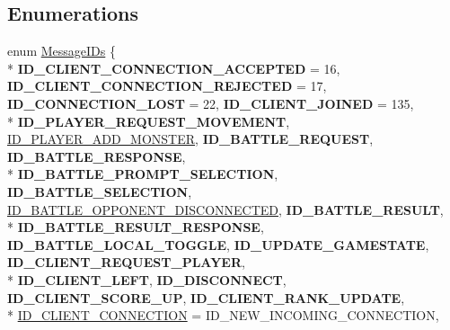 \subsection*{Enumerations}
\begin{DoxyCompactItemize}
\item 
enum \hyperlink{namespace_champ_net_plugin_a2ade5cfa7cf6c25ab7236c6b54a57821}{Message\-I\-Ds} \{ \\*
{\bfseries I\-D\-\_\-\-C\-L\-I\-E\-N\-T\-\_\-\-C\-O\-N\-N\-E\-C\-T\-I\-O\-N\-\_\-\-A\-C\-C\-E\-P\-T\-E\-D} = 16, 
{\bfseries I\-D\-\_\-\-C\-L\-I\-E\-N\-T\-\_\-\-C\-O\-N\-N\-E\-C\-T\-I\-O\-N\-\_\-\-R\-E\-J\-E\-C\-T\-E\-D} = 17, 
{\bfseries I\-D\-\_\-\-C\-O\-N\-N\-E\-C\-T\-I\-O\-N\-\_\-\-L\-O\-S\-T} = 22, 
{\bfseries I\-D\-\_\-\-C\-L\-I\-E\-N\-T\-\_\-\-J\-O\-I\-N\-E\-D} = 135, 
\\*
{\bfseries I\-D\-\_\-\-P\-L\-A\-Y\-E\-R\-\_\-\-R\-E\-Q\-U\-E\-S\-T\-\_\-\-M\-O\-V\-E\-M\-E\-N\-T}, 
\hyperlink{namespace_champ_net_plugin_a2ade5cfa7cf6c25ab7236c6b54a57821ad42c079bb7459dbaf419eeb2e845f3e2}{I\-D\-\_\-\-P\-L\-A\-Y\-E\-R\-\_\-\-A\-D\-D\-\_\-\-M\-O\-N\-S\-T\-E\-R}, 
{\bfseries I\-D\-\_\-\-B\-A\-T\-T\-L\-E\-\_\-\-R\-E\-Q\-U\-E\-S\-T}, 
{\bfseries I\-D\-\_\-\-B\-A\-T\-T\-L\-E\-\_\-\-R\-E\-S\-P\-O\-N\-S\-E}, 
\\*
{\bfseries I\-D\-\_\-\-B\-A\-T\-T\-L\-E\-\_\-\-P\-R\-O\-M\-P\-T\-\_\-\-S\-E\-L\-E\-C\-T\-I\-O\-N}, 
{\bfseries I\-D\-\_\-\-B\-A\-T\-T\-L\-E\-\_\-\-S\-E\-L\-E\-C\-T\-I\-O\-N}, 
\hyperlink{namespace_champ_net_plugin_a2ade5cfa7cf6c25ab7236c6b54a57821addd7d4ef5710787934d893be10785f0d}{I\-D\-\_\-\-B\-A\-T\-T\-L\-E\-\_\-\-O\-P\-P\-O\-N\-E\-N\-T\-\_\-\-D\-I\-S\-C\-O\-N\-N\-E\-C\-T\-E\-D}, 
{\bfseries I\-D\-\_\-\-B\-A\-T\-T\-L\-E\-\_\-\-R\-E\-S\-U\-L\-T}, 
\\*
{\bfseries I\-D\-\_\-\-B\-A\-T\-T\-L\-E\-\_\-\-R\-E\-S\-U\-L\-T\-\_\-\-R\-E\-S\-P\-O\-N\-S\-E}, 
{\bfseries I\-D\-\_\-\-B\-A\-T\-T\-L\-E\-\_\-\-L\-O\-C\-A\-L\-\_\-\-T\-O\-G\-G\-L\-E}, 
{\bfseries I\-D\-\_\-\-U\-P\-D\-A\-T\-E\-\_\-\-G\-A\-M\-E\-S\-T\-A\-T\-E}, 
{\bfseries I\-D\-\_\-\-C\-L\-I\-E\-N\-T\-\_\-\-R\-E\-Q\-U\-E\-S\-T\-\_\-\-P\-L\-A\-Y\-E\-R}, 
\\*
{\bfseries I\-D\-\_\-\-C\-L\-I\-E\-N\-T\-\_\-\-L\-E\-F\-T}, 
{\bfseries I\-D\-\_\-\-D\-I\-S\-C\-O\-N\-N\-E\-C\-T}, 
{\bfseries I\-D\-\_\-\-C\-L\-I\-E\-N\-T\-\_\-\-S\-C\-O\-R\-E\-\_\-\-U\-P}, 
{\bfseries I\-D\-\_\-\-C\-L\-I\-E\-N\-T\-\_\-\-R\-A\-N\-K\-\_\-\-U\-P\-D\-A\-T\-E}, 
\\*
\hyperlink{namespace_champ_net_plugin_a2ade5cfa7cf6c25ab7236c6b54a57821aecc0564c52e3106cfe012e5533b080da}{I\-D\-\_\-\-C\-L\-I\-E\-N\-T\-\_\-\-C\-O\-N\-N\-E\-C\-T\-I\-O\-N} = I\-D\-\_\-\-N\-E\-W\-\_\-\-I\-N\-C\-O\-M\-I\-N\-G\-\_\-\-C\-O\-N\-N\-E\-C\-T\-I\-O\-N, 

\end{DoxyCompactItemize}
